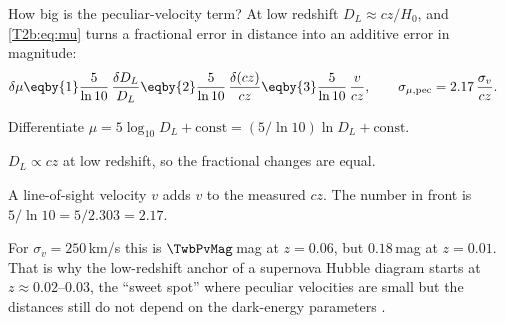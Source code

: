 How big is the peculiar-velocity term? At low redshift $D_L\approx cz/H_0$, and \eqref{T2b:eq:mu} turns a fractional error in distance into an additive error in magnitude:
\begin{align}
  \delta\mu
  &\eqby{1}\frac{5}{\ln10}\,\frac{\delta D_L}{D_L}
  \eqby{2}\frac{5}{\ln10}\,\frac{\delta(cz)}{cz}
  \eqby{3}\frac{5}{\ln10}\,\frac{v}{cz},
  \qquad
  \sigma_{\mu,\rm pec}=2.17\,\frac{\sigma_v}{cz}.
  \label{T2b:eq:mu-pec}
\end{align}
\begin{explain}
  \item Differentiate $\mu=5\log_{10}D_L+\text{const}=(5/\ln10)\ln D_L+\text{const}$.
  \item $D_L\propto cz$ at low redshift, so the fractional changes are equal.
  \item A line-of-sight velocity $v$ adds $v$ to the measured $cz$. The number in front is $5/\ln10=5/2.303=2.17$.
\end{explain}
For $\sigma_v=250$\,km/s this is $\TwbPvMag$\,mag at $z=0.06$, but $0.18$\,mag at $z=0.01$. That is why the low-redshift anchor of a supernova Hubble diagram starts at $z\approx0.02$--$0.03$, the ``sweet spot'' where peculiar velocities are small but the distances still do not depend on the dark-energy parameters \cite[p.~33]{Weinberg2013}.

